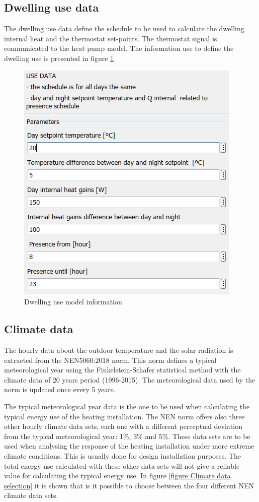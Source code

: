 \subsection{Dwelling use data}
\label{Dwelling use data}
The dwelling use data define the schedule to be used to calculate the dwelling internal heat and the thermostat set-points. The thermostat signal is communicated to the heat pump model. The information use to define the dwelling use is presented in figure \ref{figure:Dwelling info}
\\
\begin{figure}[H]
	\centering
	\includegraphics[width=0.8\columnwidth]{Pictures/Dwelling use model information.png}
	\caption[Short title]{Dwelling use model information}
	\label{figure:Dwelling info}
\end{figure}
\newpage
\subsection{Climate data}
\label{climatedata}
The hourly data about the outdoor temperature and the solar radiation is extracted from the NEN5060:2018 norm. This norm defines a typical meteorological year using the Finkelstein-Schafer statistical method with the climate data of 20 years period (1996-2015). The meteorological data used by the norm is updated once every 5 years.  

The typical meteorological year data is the one to be used when calculating the typical energy use of the heating installation. The NEN norm offers also three other hourly climate data sets, each one with a different perceptual deviation from the typical meteorological year: 1\%, 3\% and 5\%. These data sets are to be used when analysing the response of the heating installation under more extreme climate conditions. This is usually done for design installation purposes. The total energy use calculated with these other data sets will not give a reliable value for calculating the typical energy use.  In figure \ref{figure Climate data selection} it is shown that is it possible to choose between the four different NEN climate data sets. 

